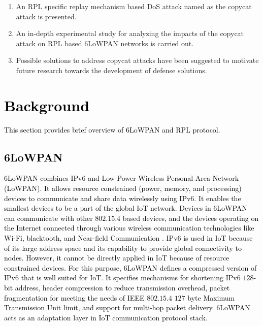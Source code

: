 \documentclass[]{svjour3}                     %
\begin{document}
\begin{enumerate}
	\item An RPL specific replay mechanism based DoS attack named as the copycat attack is presented.
	\item An in-depth experimental study for analyzing the impacts of the copycat attack on RPL based 6LoWPAN networks is carried out. 
	\item Possible solutions to address copycat attacks have been suggested to motivate future research towards the development of defense solutions. 
\end{enumerate}


\section{\textcolor{black}{Background}}\label{background}
\textcolor{black}{This section provides brief overview of 6LoWPAN and RPL protocol.}

\subsection{\textcolor{black}{6LoWPAN}}
\textcolor{black}{6LoWPAN \cite{rfc6LoWPAN, olsson20146lowpan} combines IPv$ 6 $ and Low-Power Wireless Personal Area Network (LoWPAN). It allows resource constrained (power, memory, and processing) devices to communicate and share data wirelessly using IPv$ 6 $. It enables the smallest devices to be a part of the global IoT network.  Devices in 6LoWPAN can communicate with other $ 802.15.4 $ based devices, and the devices operating on the Internet connected through various wireless communication technologies like Wi-Fi, blacktooth, and  Near-field Communication \cite{hussain2017internet}. IPv$ 6 $ is used in IoT because of its large address space and its capability to provide global connectivity to nodes. However, it cannot be directly applied in IoT because of resource constrained devices. For this purpose, $ 6 $LoWPAN defines a compressed version of IPv$ 6 $ that is well suited for IoT. It specifies mechanisms for shortening IPv$ 6 $ $ 128 $-bit address, header compression to reduce transmission overhead, packet fragmentation for meeting the needs of IEEE $ 802.15.4 $ $ 127 $ byte Maximum Transmission Unit limit, and support for multi-hop packet delivery. $ 6 $LoWPAN acts as an adaptation layer in IoT communication protocol stack.}
\end{document}
